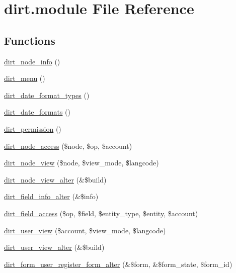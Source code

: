 \hypertarget{dirt_8module}{}\section{dirt.\+module File Reference}
\label{dirt_8module}
\subsection*{Functions}
\begin{DoxyCompactItemize}
\item 
\mbox{\hyperlink{dirt_8module_a5680ba7e8861022daa46174274a09070}{dirt\+\_\+node\+\_\+info}} ()
\item 
\mbox{\hyperlink{dirt_8module_a2b18569bbd5b374b80008bbea759095b}{dirt\+\_\+menu}} ()
\item 
\mbox{\hyperlink{dirt_8module_abd03cb06ddc53ccff78870f36cf3a41e}{dirt\+\_\+date\+\_\+format\+\_\+types}} ()
\item 
\mbox{\hyperlink{dirt_8module_aa5bab157874401361d738401cefff845}{dirt\+\_\+date\+\_\+formats}} ()
\item 
\mbox{\hyperlink{dirt_8module_a85ff0883304c7c4305503c8569093321}{dirt\+\_\+permission}} ()
\item 
\mbox{\hyperlink{dirt_8module_a0f6be7a4eed79130c141df1856106168}{dirt\+\_\+node\+\_\+access}} (\$node, \$op, \$account)
\item 
\mbox{\hyperlink{dirt_8module_a9c15d661d9c36e838264d8c2ad2bde4c}{dirt\+\_\+node\+\_\+view}} (\$node, \$view\+\_\+mode, \$langcode)
\item 
\mbox{\hyperlink{dirt_8module_a957fa2899d3024c6e34db219084309c1}{dirt\+\_\+node\+\_\+view\+\_\+alter}} (\&\$build)
\item 
\mbox{\hyperlink{dirt_8module_a023857f0ffdc72c29b8d57470256a2be}{dirt\+\_\+field\+\_\+info\+\_\+alter}} (\&\$info)
\item 
\mbox{\hyperlink{dirt_8module_a34c7d2c10223ba49e9d49a6869b733f5}{dirt\+\_\+field\+\_\+access}} (\$op, \$field, \$entity\+\_\+type, \$entity, \$account)
\item 
\mbox{\hyperlink{dirt_8module_a434bfeb2a992b8bcdde295dd2fa8d37f}{dirt\+\_\+user\+\_\+view}} (\$account, \$view\+\_\+mode, \$langcode)
\item 
\mbox{\hyperlink{dirt_8module_af66e9edbdd9df75addcb75368370dd86}{dirt\+\_\+user\+\_\+view\+\_\+alter}} (\&\$build)
\item 
\mbox{\hyperlink{dirt_8module_a7a75a530ebb6bccae01e0aff7d8ea85a}{dirt\+\_\+form\+\_\+user\+\_\+register\+\_\+form\+\_\+alter}} (\&\$form, \&\$form\+\_\+state, \$form\+\_\+id)

\end{DoxyCompactItemize}
